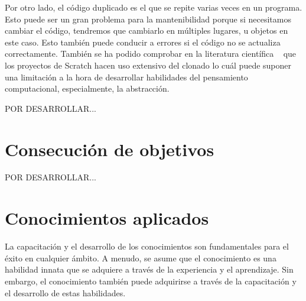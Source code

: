 \documentclass[a4paper, 12pt]{book}
\begin{document}
Por otro lado, el código duplicado es el que se repite varias veces en un programa. Esto puede ser un gran problema para la mantenibilidad porque si necesitamos cambiar el código, tendremos que cambiarlo en múltiples lugares, u objetos en este caso. Esto también puede conducir a errores si el código no se actualiza correctamente. También se ha podido comprobar en la literatura científica ~\cite{baxter_yahin} que los proyectos de Scratch hacen uso extensivo del clonado lo cuál puede suponer una limitación a la hora de desarrollar habilidades del pensamiento computacional, especialmente, la abstracción.

POR DESARROLLAR...

\section{Consecución de objetivos}
\label{sec:consecucion-objetivos}





POR DESARROLLAR...

\section{Conocimientos aplicados}
\label{sec:aplicacion}


La capacitación y el desarrollo de los conocimientos son fundamentales para el éxito en cualquier ámbito. A menudo, se asume que el conocimiento es una habilidad innata que se adquiere a través de la experiencia y el aprendizaje. Sin embargo, el conocimiento también puede adquirirse a través de la capacitación y el desarrollo de estas habilidades.
\end{document}
